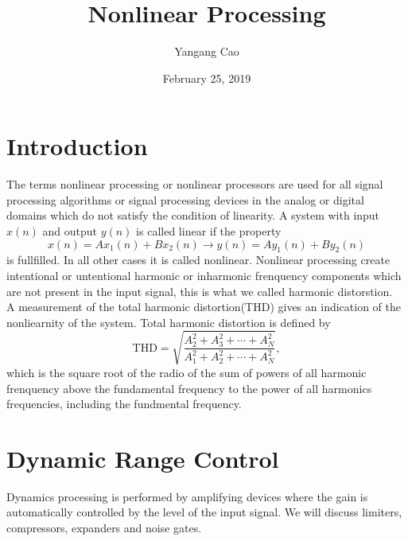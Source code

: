 \documentclass[10pt,a4paper,oneside]{article}
\author{Yangang Cao}
\date{February 25, 2019}
\begin{document}
\title{Nonlinear Processing}
\maketitle 
\section{Introduction}
The terms nonlinear processing or nonlinear processors are used for all signal processing algorithms or signal processing devices in the analog or digital domains which do not satisfy the condition of linearity. A system with input $x(n)$ and output $y(n)$ is called 	linear if the property
\[
x(n) = Ax_1(n) + Bx_2(n) \rightarrow y(n) = Ay_1(n) + By_2(n)
\]
is fullfilled. In all other cases it is called nonlinear. Nonlinear processing create intentional or untentional harmonic or inharmonic frenquency components which are not present in the input signal, this is what we called harmonic distorstion.\\

A measurement of the total harmonic distortion(THD) gives an indication of the nonliearnity of the system. Total harmonic distortion is defined by
\[
\mathrm{THD} = \sqrt{\frac{A_2^2 + A_3^2 + \cdots + A_N^2}{A_1^2 + A_2^2 + \cdots + A_N^2}},
\]
which is the square root of the radio of the sum of powers of all harmonic frenquency above the fundamental frequency to the power of all harmonics frequencies, including the fundmental frequency.
\section{Dynamic Range Control}
Dynamics processing is performed by amplifying devices where the gain is automatically controlled by the level of the input signal. We will discuss limiters, compressors, expanders and noise gates. \\
\end{document}
